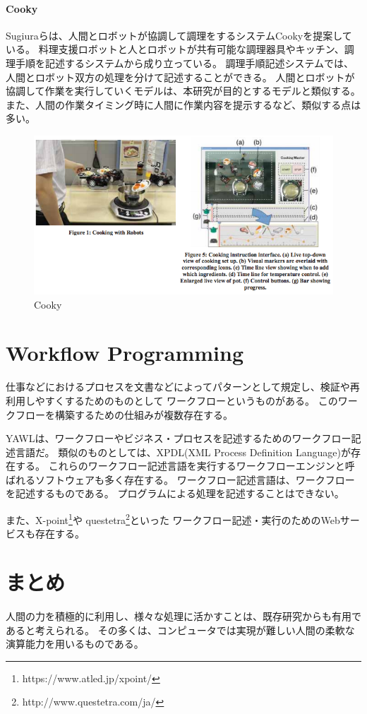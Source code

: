 \paragraph{Cooky}\label{cooky}

\mbox{}

Sugiuraらは、人間とロボットが協調して調理をするシステムCooky\cite{cooky}を提案している。
料理支援ロボットと人とロボットが共有可能な調理器具やキッチン、調理手順を記述するシステムから成り立っている。
調理手順記述システムでは、人間とロボット双方の処理を分けて記述することができる。
人間とロボットが協調して作業を実行していくモデルは、本研究が目的とするモデルと類似する。
また、人間の作業タイミング時に人間に作業内容を提示するなど、類似する点は多い。

\begin{figure}[htbp]
  \begin{center}
  \includegraphics[width=.6\linewidth,bb=0 0 633 336]{images/cooky.png}
  \end{center}
  \caption{Cooky}
  \label{fig:cooky}
\end{figure}

\section{Workflow Programming}\label{workflow-programming}

仕事などにおけるプロセスを文書などによってパターンとして規定し、検証や再利用しやすくするためのものとして
ワークフローというものがある。
このワークフローを構築するための仕組みが複数存在する。

YAWL\cite{yawl}は、ワークフローやビジネス・プロセスを記述するためのワークフロー記述言語だ。
類似のものとしては、XPDL(XML Process Definition
Language)\cite{xpdl}が存在する。
これらのワークフロー記述言語を実行するワークフローエンジンと呼ばれるソフトウェアも多く存在する。
ワークフロー記述言語は、ワークフローを記述するものである。
プログラムによる処理を記述することはできない。

また、X-point\footnote{https://www.atled.jp/xpoint/}や
questetra\footnote{http://www.questetra.com/ja/}といった
ワークフロー記述・実行のためのWebサービスも存在する。

\section{まとめ}\label{ux307eux3068ux3081}

人間の力を積極的に利用し、様々な処理に活かすことは、既存研究からも有用であると考えられる。
その多くは、コンピュータでは実現が難しい人間の柔軟な演算能力を用いるものである。

